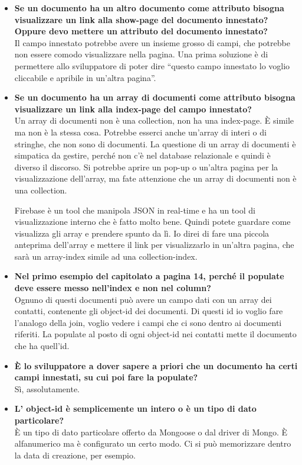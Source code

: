 \begin{itemize}
		\item
		{\bfseries Se un documento ha un altro documento come attributo bisogna visualizzare un link alla show-page del documento innestato? Oppure devo mettere un attributo del documento innestato?} \\
		Il campo innestato potrebbe avere un insieme grosso di campi, che potrebbe non essere comodo visualizzare nella pagina. Una prima soluzione è di permettere allo sviluppatore di poter dire ``questo campo innestato lo voglio cliccabile e apribile in un'altra pagina''.
		
		\item
		{\bfseries Se un documento ha un array di documenti come attributo bisogna visualizzare un link alla index-page del campo innestato?} \\
		Un array di documenti non è una collection, non ha una index-page. È simile ma non è la stessa cosa. Potrebbe esserci anche un'array di interi o di stringhe, che non sono di documenti. La questione di un array di documenti è simpatica da gestire, perché non c'è nel database relazionale e quindi è diverso il discorso. Si potrebbe aprire un pop-up o un'altra pagina per la visualizzazione dell'array, ma fate attenzione che un array di documenti non è una collection.
		
		Firebase è un tool che manipola JSON in real-time e ha un tool di visualizzazione interno che è fatto molto bene. Quindi potete guardare come visualizza gli array e prendere spunto da lì. Io direi di fare una piccola anteprima dell'array e mettere il link per visualizzarlo in un'altra pagina, che sarà un array-index simile ad una collection-index.
		
		\item
		{\bfseries Nel primo esempio del capitolato a pagina 14, perché il populate deve essere messo nell'index e non nel column?} \\
		Ognuno di questi documenti può avere un campo dati con un array dei contatti, contenente gli object-id dei documenti. Di questi id io voglio fare l'analogo della join, voglio vedere i campi che ci sono dentro ai documenti riferiti. La populate al posto di ogni object-id nei contatti mette il documento che ha quell'id.
		
		\item
		{\bfseries È lo sviluppatore a dover sapere a priori che un documento ha certi campi innestati, su cui poi fare la populate?} \\
		Sì, assolutamente.
		
		\item
		{\bfseries L' object-id è semplicemente un intero o è un tipo di dato particolare?} \\
		È un tipo di dato particolare offerto da Mongoose o dal driver di Mongo. È alfanumerico ma è configurato un certo modo. Ci si può memorizzare dentro la data di creazione, per esempio.
		

\end{itemize}
